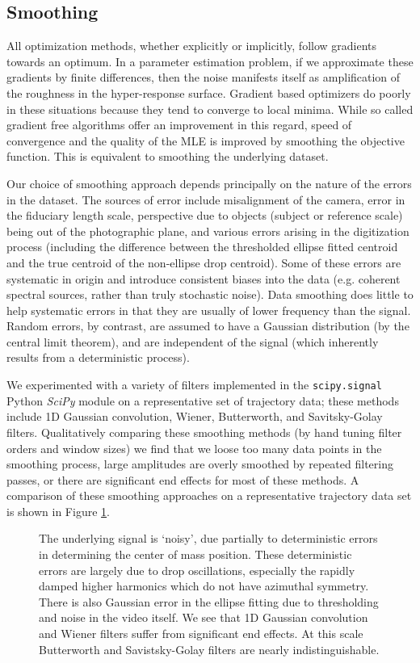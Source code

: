 \documentclass[12pt,a4paper,oneside]{book}
\begin{document}
\subsection{Smoothing}
All optimization methods, whether explicitly or implicitly, follow gradients towards an optimum. In a parameter estimation problem, if we approximate these gradients by finite differences, then the noise manifests itself as amplification of the roughness in the hyper-response surface. Gradient based optimizers do poorly in these situations because they tend to converge to local minima. While so called gradient free algorithms offer an improvement in this regard, speed of convergence and the quality of the MLE is improved by smoothing the objective function. This is equivalent to smoothing the underlying dataset.

Our choice of smoothing approach depends principally on the nature of the errors in the dataset. The sources of error include misalignment of the camera, error in the fiduciary length scale, perspective due to objects (subject or reference scale) being out of the photographic plane, and various errors arising in the digitization process (including the difference between the thresholded ellipse fitted centroid and the true centroid of the non-ellipse drop centroid). Some of these errors are systematic in origin and introduce consistent biases into the data (e.g. coherent spectral sources, rather than truly stochastic noise). Data smoothing does little to help systematic errors in that they are usually of lower frequency than the signal. Random errors, by contrast, are assumed to have a Gaussian distribution (by the central limit theorem), and are independent of the signal (which inherently results from a deterministic process).

We experimented with a variety of filters implemented in the \verb|scipy.signal| Python \emph{SciPy} \cite{oliphant_python_2007} module on a representative set of trajectory data; these methods include 1D Gaussian convolution, Wiener, Butterworth, and Savitsky-Golay filters. Qualitatively comparing these smoothing methods (by hand tuning filter orders and window sizes) we find that we loose too many data points in the smoothing process, large amplitudes are overly smoothed by repeated filtering passes, or there are significant end effects for most of these methods. A comparison of these smoothing approaches on a representative trajectory data set is shown in Figure \ref{fig:y_filtered}.
\begin{figure}
    \centering
    
       \caption{The underlying signal is `noisy', due partially to deterministic errors in determining the center of mass position. These deterministic errors are largely due to drop oscillations, especially the rapidly damped higher harmonics which do not have azimuthal symmetry. There is also Gaussian error in the ellipse fitting due to thresholding and noise in the video itself. We see that 1D Gaussian convolution and Wiener filters suffer from significant end effects. At this scale Butterworth and Savistsky-Golay filters are nearly indistinguishable.}
      \label{fig:y_filtered}
\end{figure}
\end{document}
